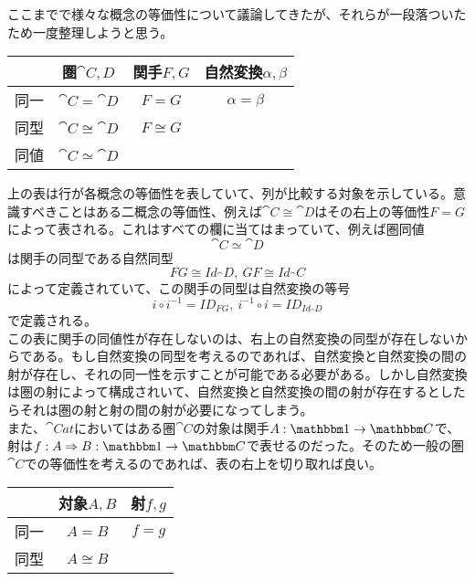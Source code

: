   ここまでで様々な概念の等価性について議論してきたが、それらが一段落ついたため一度整理しようと思う。
  \begin{table}[htb]
    \centering
      \begin{tabular}{|c||c|c|c|}  \hline
      &圏$\cat{C,D}$&関手$F,G$&自然変換$\alpha,\beta$\\ \hline \hline
      同一&$\cat{C}=\cat{D}$&$F=G$&$\alpha=\beta$\\ \hline
      同型&$\cat{C}\cong\cat{D}$&$F\cong G$&\\ \hline
      同値&$\cat{C}\simeq\cat{D}$&&\\ \hline
    \end{tabular}
  \end{table}
  上の表は行が各概念の等価性を表していて、列が比較する対象を示している。意識すべきことはある二概念の等価性、例えば$\cat{C}\cong \cat{D}$はその右上の等価性$F=G$によって表される。これはすべての欄に当てはまっていて、例えば圏同値\[\cat{C}\simeq\cat{D}\]は関手の同型である自然同型\[FG\cong Id_\cat{D},\ GF\cong Id_\cat{C}\]によって定義されていて、この関手の同型は自然変換の等号\[i\circ i^{-1}=ID_{FG},\ i^{-1}\circ i=ID_{Id_\cat{D}}\]で定義される。\\
  この表に関手の同値性が存在しないのは、右上の自然変換の同型が存在しないからである。もし自然変換の同型を考えるのであれば、自然変換と自然変換の間の射が存在し、それの同一性を示すことが可能である必要がある。しかし自然変換は圏の射によって構成されいて、自然変換と自然変換の間の射が存在するとしたらそれは圏の射と射の間の射が必要になってしまう。\\
  また、$\cat{Cat}$においてはある圏$\cat{C}$の対象は関手$\functor{A}{1}{C}$で、射は$\natf{f}{A}{B}{1}{C}$で表せるのだった。そのため一般の圏$\cat{C}$での等価性を考えるのであれば、表の右上を切り取れば良い。
  \begin{table}[htb]
    \centering
      \begin{tabular}{|c||c|c|}  \hline
      &対象$A,B$&射$f,g$\\ \hline \hline
      同一&$A=B$&$f=g$\\ \hline
      同型&$A\cong B$&\\ \hline
    \end{tabular}
  \end{table}

